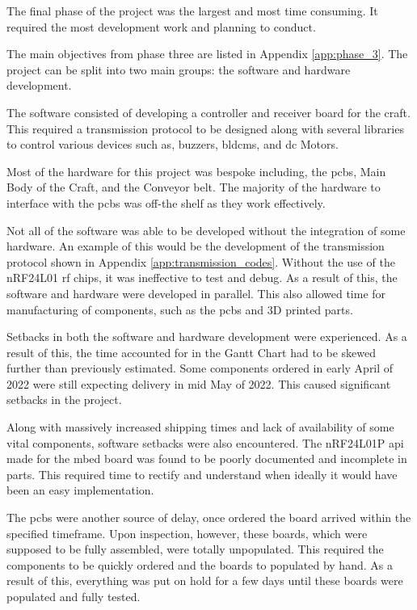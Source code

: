 \documentclass [12pt]{article}
\begin{document}
The final phase of the project was the largest and most time consuming. It required the most development work and planning to conduct. 

The main objectives from phase three are listed in Appendix \ref{app:phase_3}. The project can be split into two main groups: the software and hardware development. 

The software consisted of developing a controller and receiver board for the craft. This required a transmission protocol to be designed along with several libraries to control various devices such as, buzzers, \gls{bldcm}s, and \gls{dc} Motors. 

Most of the hardware for this project was bespoke including, the \gls{pcb}s, Main Body of the Craft, and the Conveyor belt. The majority of the hardware to interface with the \gls{pcb}s was off-the shelf as they work effectively.

Not all of the software was able to be developed without the integration of some hardware. An example of this would be the development of the transmission protocol shown in Appendix \ref{app:transmission_codes}. Without the use of the nRF24L01 \gls{rf} chips, it was ineffective to test and debug. As a result of this, the software and hardware were developed in parallel. This also allowed time for manufacturing of components, such as the \gls{pcb}s and 3D printed parts.

Setbacks in both the software and hardware development were experienced. As a result of this, the time accounted for in the Gantt Chart had to be skewed further than previously estimated. Some components ordered in early April of 2022 were still expecting delivery in mid May of 2022. This caused significant setbacks in the project. 

Along with massively increased shipping times and lack of availability of some vital components, software setbacks were also encountered. The nRF24L01P \gls{api} made for the \gls{mbed} board was found to be poorly documented and incomplete in parts. This required time to rectify and understand when ideally it would have been an easy implementation. 

The \gls{pcb}s were another source of delay, once ordered the board arrived within the specified timeframe. Upon inspection, however, these boards, which were supposed to be fully assembled, were totally unpopulated. This required the components to be quickly ordered and the boards to populated by hand. As a result of this, everything was put on hold for a few days until these boards were populated and fully tested. 
\end{document}
